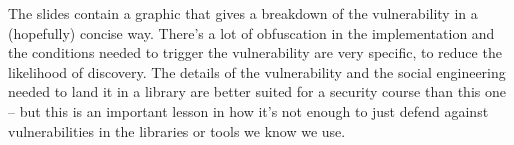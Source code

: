 The slides contain a graphic that gives a breakdown of the vulnerability in a (hopefully) concise way. There's a lot of obfuscation in the implementation and the conditions needed to trigger the vulnerability are very specific, to reduce the likelihood of discovery. The details of the vulnerability and the social engineering needed to land it in a library are better suited for a security course than this one -- but this is an important lesson in how it's not enough to just defend against vulnerabilities in the libraries or tools we know we use.





